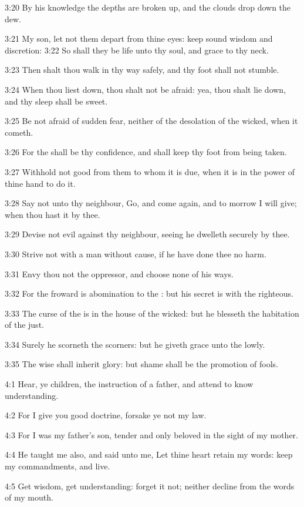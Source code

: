 3:20 By his knowledge the depths are broken up, and the clouds drop down the dew.

3:21 My son, let not them depart from thine eyes: keep sound wisdom and discretion: 3:22 So shall they be life unto thy soul, and grace to thy neck.

3:23 Then shalt thou walk in thy way safely, and thy foot shall not stumble.

3:24 When thou liest down, thou shalt not be afraid: yea, thou shalt lie down, and thy sleep shall be sweet.

3:25 Be not afraid of sudden fear, neither of the desolation of the wicked, when it cometh.

3:26 For the \LORD shall be thy confidence, and shall keep thy foot from being taken.

3:27 Withhold not good from them to whom it is due, when it is in the power of thine hand to do it.

3:28 Say not unto thy neighbour, Go, and come again, and to morrow I will give; when thou hast it by thee.

3:29 Devise not evil against thy neighbour, seeing he dwelleth securely by thee.

3:30 Strive not with a man without cause, if he have done thee no harm.

3:31 Envy thou not the oppressor, and choose none of his ways.

3:32 For the froward is abomination to the \LORD: but his secret is with the righteous.

3:33 The curse of the \LORD is in the house of the wicked: but he blesseth the habitation of the just.

3:34 Surely he scorneth the scorners: but he giveth grace unto the lowly.

3:35 The wise shall inherit glory: but shame shall be the promotion of fools.

4:1 Hear, ye children, the instruction of a father, and attend to know understanding.

4:2 For I give you good doctrine, forsake ye not my law.

4:3 For I was my father's son, tender and only beloved in the sight of my mother.

4:4 He taught me also, and said unto me, Let thine heart retain my words: keep my commandments, and live.

4:5 Get wisdom, get understanding: forget it not; neither decline from the words of my mouth.

